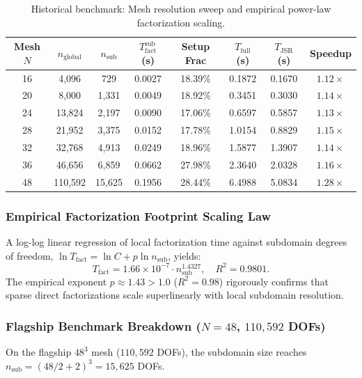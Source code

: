 \documentclass[preprint,12pt,3p]{elsarticle}
\begin{document}
\begin{table}[htbp]
\centering
\small
\caption{Historical benchmark: Mesh resolution sweep and empirical power-law factorization scaling.}
\label{tab:pillar5_scaling}
\begin{tabular}{cccccccc}
\toprule
Mesh $N$ & $n_{\text{global}}$ & $n_{\text{sub}}$ & $T_{\text{fact}}^{\text{sub}}$ (s) & Setup Frac & $T_{\text{full}}$ (s) & $T_{\text{JSR}}$ (s) & Speedup \\
\midrule
16 & 4,096 & 729 & 0.0027 & 18.39\% & 0.1872 & 0.1670 & $1.12\times$ \\
20 & 8,000 & 1,331 & 0.0049 & 18.92\% & 0.3451 & 0.3030 & $1.14\times$ \\
24 & 13,824 & 2,197 & 0.0090 & 17.06\% & 0.6597 & 0.5857 & $1.13\times$ \\
28 & 21,952 & 3,375 & 0.0152 & 17.78\% & 1.0154 & 0.8829 & $1.15\times$ \\
32 & 32,768 & 4,913 & 0.0249 & 18.96\% & 1.5877 & 1.3907 & $1.14\times$ \\
36 & 46,656 & 6,859 & 0.0662 & 27.98\% & 2.3640 & 2.0328 & $1.16\times$ \\
48 & 110,592 & 15,625 & 0.1956 & 28.44\% & 6.4988 & 5.0834 & $\mathbf{1.28\times}$ \\
\bottomrule
\end{tabular}
\end{table}

\subsubsection{Empirical Factorization Footprint Scaling Law}
A log-log linear regression of local factorization time against subdomain degrees of freedom, $\ln T_{\text{fact}} = \ln C + p \ln n_{\text{sub}}$, yields:
\begin{equation}
T_{\text{fact}} = 1.66 \times 10^{-7} \cdot n_{\text{sub}}^{1.4327}, \quad R^2 = 0.9801.
\label{eq:power_law}
\end{equation}
The empirical exponent $p \approx 1.43 > 1.0$ ($R^2 = 0.98$) rigorously confirms that sparse direct factorizations scale superlinearly with local subdomain resolution.

\subsubsection{Flagship Benchmark Breakdown ($N=48$, $110,592$ DOFs)}
On the flagship $48^3$ mesh ($110,592$ DOFs), the subdomain size reaches $n_{\text{sub}} = (48/2 + 2)^3 = 15,625$ DOFs.
\end{document}
